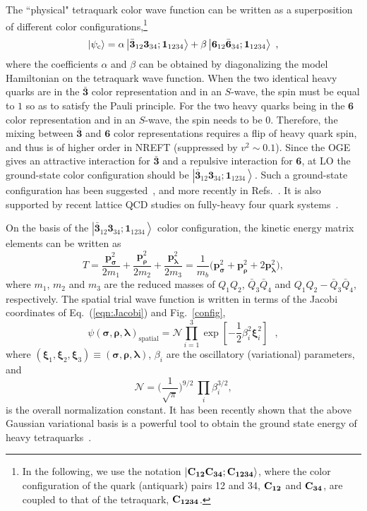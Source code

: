 \documentclass[twocolumn,showpacs,superscriptaddress,preprintnumbers,nofootinbib,prd]{revtex4-1}
\def\be{\begin{equation}}
\def\ee{\end{equation}}
\begin{document}
The ``physical" tetraquark color wave function can be written as
a superposition of different color configurations,\footnote{In the following,
we use the notation $\left| \bf{C}_{12} \bf{C}_{34}; \bf{C}_{1234} \right\rangle$,
where the color configuration of the quark (antiquark) pairs 12 and 34,
$\bf{C}_{12}$ and $\bf{C}_{34}$, are coupled to that of the tetraquark, $\bf{C}_{1234}$.}
\begin{equation}
	\label{eqn:Psi-c-tetra-phys}
	\left|\psi_{\rm c} \right\rangle = \alpha \left| \bar{\textbf{3}}_{12}\textbf{3}_{34};
    \textbf{1}_{1234} \right\rangle + \beta \left| \textbf{6}_{12}\bar{\textbf{6}}_{34};
    \textbf{1}_{1234} \right\rangle
	\mbox{ },
\end{equation}
where the coefficients $\alpha$ and $\beta$ can be obtained by diagonalizing
the model Hamiltonian on the tetraquark wave function.
When the two identical heavy quarks are in the $\bar{\textbf{3}}$ color representation and in an $S$-wave, the spin must be equal to $1$ so as to satisfy the Pauli principle. For the two heavy quarks being in the ${\textbf{6}}$ color representation and in an $S$-wave, the spin needs to be 0. Therefore, the mixing between $\bar{\textbf{3}}$ and ${\textbf{6}}$ color representations requires a flip of heavy quark spin, and thus is of higher order in NREFT (suppressed by $v^2\sim0.1$).
Since the OGE gives an attractive interaction for $\bar{\textbf{3}}$ and a repulsive interaction for ${\textbf{6}}$, at LO the ground-state color configuration should be
$\left| \bar{\textbf{3}}_{12}\textbf{3}_{34};
\textbf{1}_{1234} \right\rangle$.
Such a ground-state configuration has been suggested~\cite{Jaffe:2004ph,Santopinto:2006my}, and more recently in Refs.~\cite{Eichten:2017ual,Wu:2016vtq,Park:2013fda}. It is also supported by recent lattice QCD studies on
fully-heavy four quark systems~\cite{Cardoso:2012uka}.


On the basis of the $\left| \bar{\textbf{3}}_{12}\textbf{3}_{34};
\textbf{1}_{1234} \right\rangle$ color configuration, the kinetic
energy matrix elements can be written as
\be
T=\frac{\textbf{p}_{\bm\sigma}^{2}}{2m_{1}}+\frac{\textbf{p}_{\bm\rho}^{2}}{2m_{2}}+\frac{\textbf{p}_{\bm\lambda}^{2}}{2m_{3}}=
\frac{1}{m_b}\bigg(\textbf{p}_{\bm\sigma}^{2}+\textbf{p}_{\bm\rho}^{2}+2\textbf{p}_{\bm\lambda}^{2}\bigg),
\ee
where $m_1$, $m_2$ and $m_3$ are the reduced masses of $Q_1 Q_2$,
$\bar{Q}_3\bar{Q}_4$ and $Q_1 Q_2-\bar{Q}_3\bar{Q}_4$, respectively.
The spatial trial wave function is written in terms of the Jacobi coordinates of
Eq.~(\ref{eqn:Jacobi}) and Fig.~\ref{config},
\be
\psi(\bm\sigma, \bm\rho, \bm\lambda)_{\textrm{spatial}} = \mathcal N \prod_{i=1}^3 \exp\left[-\frac{1}{2} \beta^{2}_i \bm\xi_{i}^{2}\right]  \mbox{ },
\ee
where $(\bm\xi_{1},\bm\xi_{2},\bm\xi_{3})\equiv(\bm\sigma, \bm\rho, \bm\lambda)$,
$\beta_i$ are the oscillatory (variational) parameters, and
\be
\mathcal N= \bigg(\frac{1}{\sqrt{\pi}} \bigg)^{9/2}~\prod_{i} \beta_{i}^{3/2},
\ee
is the overall normalization constant. It has been recently
shown that the above Gaussian variational basis
is a powerful tool to obtain the ground state energy of
heavy tetraquarks~\cite{Park:2013fda}.
\end{document}
